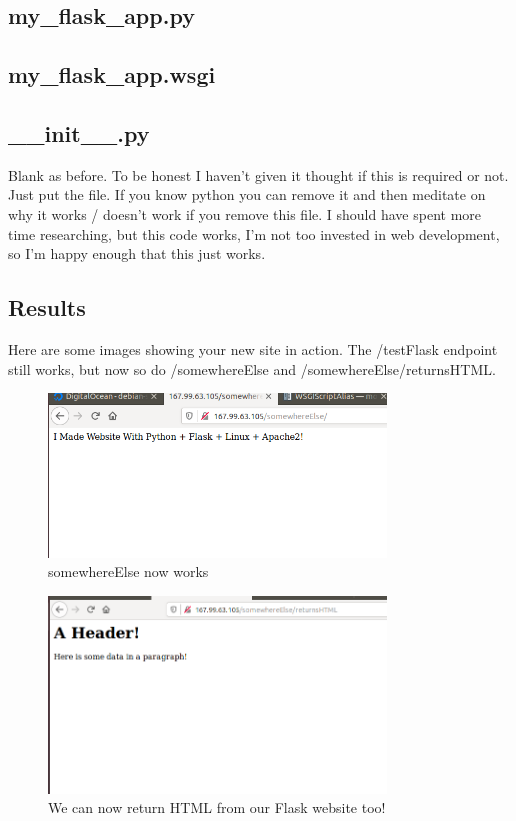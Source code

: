 \documentclass[10pt]{article}
\begin{document}
\subsection{my\_flask\_app.py}


\subsection{my\_flask\_app.wsgi}


\subsection{\_\_init\_\_.py}
Blank as before. To be honest I haven't given it thought if this is required or
not. Just put the file. If you know python you can remove it and then meditate
on why it works / doesn't work if you remove this file. I should have spent more
time researching, but this code works, I'm not too invested in web development,
so I'm happy enough that this just works.

\subsection{ Results }
Here are some images showing your new site in action. The /testFlask endpoint still works, but now so do /somewhereElse and /somewhereElse/returnsHTML.

\begin{figure}[h]
  \centering
    \includegraphics[width=0.8\textwidth]{somewhereElse.png}
  \caption{somewhereElse now works}
\end{figure}

\begin{figure}[h]
  \centering
    \includegraphics[width=0.8\textwidth]{somewhereElse_returnsHTML.png}
  \caption{We can now return HTML from our Flask website too!}
\end{figure}
\end{document}
